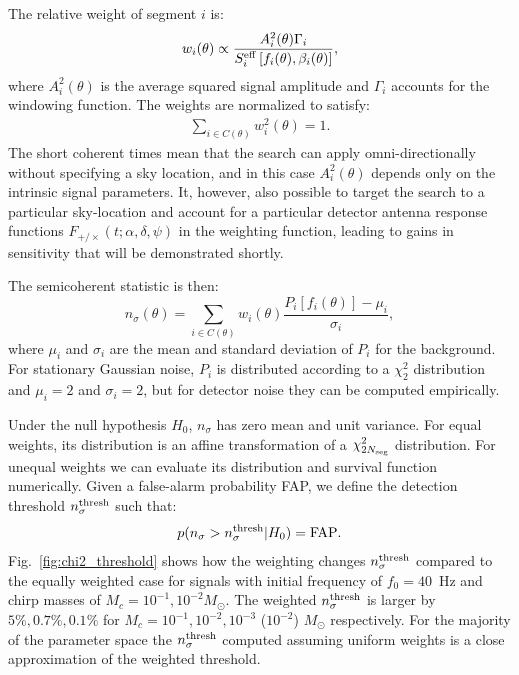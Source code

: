 \documentclass[aps,prd,amsmath,floats,floatfix, twocolumn,
superscriptaddress,nofootinbib,showpacs]{revtex4-2}
\begin{document}
The relative weight of segment $i$ is:
\begin{equation}
w_i(\theta)
\propto
\frac{A_i^2(\theta)\Gamma_i}
{S_i^{\rm eff}\left[f_i(\theta), \beta_i(\theta)\right]}, \label{eq:weights}
\end{equation}
where $A_i^2(\theta)$ is the average squared signal amplitude and $\Gamma_i$ accounts for
the windowing function. The weights are normalized to satisfy: 
\begin{gather}
    \sum_{i \in C(\theta)}w_i^2(\theta)=1 .
\end{gather}
The short coherent times mean that the search can apply omni-directionally without specifying a sky location, and in this case $A_i^2(\theta)$ depends only on the intrinsic signal parameters. It, however, also possible to target the search to a particular sky-location and account for a particular detector antenna response functions $F_{+/\times}(t;\alpha,\delta,\psi)$ in the weighting function, leading to gains in sensitivity that will be demonstrated shortly.

The semicoherent statistic is then:
\begin{equation}
n_\sigma(\theta)
=
\sum_{i\in C(\theta)}
w_i(\theta)
\frac{P_i\left[f_i(\theta)\right]-\mu_i}{\sigma_i}
,
\label{eq:semicoherent_statistic}
\end{equation}
where $\mu_i$ and $\sigma_i$ are the mean and standard deviation of $P_i$ for the background. For stationary Gaussian noise, $P_i$ is distributed according to a $\chi_2^2$ distribution and $\mu_i=2$ and $\sigma_i=2$, but for detector noise they can be computed empirically. 

Under the null hypothesis $H_0$, $n_\sigma$ has zero mean and unit variance. For equal weights, its distribution is an affine transformation of a $\chi_{2N_{\rm seg}}^2$ distribution. For unequal weights we can evaluate its distribution and survival function numerically. Given a false-alarm probability FAP, we define the detection threshold $n_\sigma^{\rm thresh}$ such that:
\begin{gather}
    p(n_\sigma > n_\sigma^{\rm thresh} | H_0) = {\rm FAP} .
\end{gather}
Fig.~\ref{fig:chi2_threshold} shows how the weighting changes $n_\sigma^{\rm thresh}$ compared to the equally weighted case for signals with initial frequency of $f_0=40$~Hz and chirp masses of $M_c = 10^{-1}, 10^{-2}M_\odot$. The weighted $n_\sigma^{\rm thresh}$ is larger by $5\%, 0.7\%, 0.1\%$ for $M_c = 10^{-1}, 10^{-2}, 10^{-3}$ ($10^{-2}$) $M_\odot$ respectively. For the majority of the parameter space the $n_\sigma^{\rm thresh}$ computed assuming uniform weights is a close approximation of the weighted threshold. 
\end{document}
